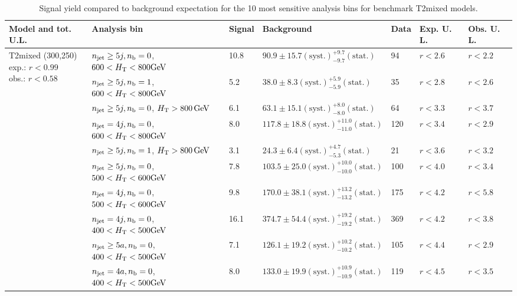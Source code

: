 \begin{table}[h!] 
  \scriptsize
  \caption{ 
Signal yield compared to background expectation for the 10 most sensitive analysis bins 
for benchmark T2mixed models.
  \label{tab:sigBenchmarksYields_T2mixed}}
  \centering 
  \begin{tabular}{ lllllll } 
    \hline 
    \hline 
    Model and tot. U.L. & Analysis bin & Signal & Background & Data & Exp. U. L. & Obs. U. L. \\ \hline
\multirow{10}{*}{\parbox[t]{2.3cm}{T2mixed (300,250)\\exp.: $r<0.99$\\obs.: $r<0.58$}}
 & $n_{\mathrm{jet}} \geq5j,n_{\text{b}} =0$, $600 < \mbox{$H_\text{T}$} < 800 \mathrm{GeV}$ & 10.8 & $90.9 \pm 15.7 \mathrm{(syst.)} ^{+9.7}_{-9.7} \mathrm{(stat.)}$ & 94 & $r < 2.6$ & $r < 2.2$\\ 
 & $n_{\mathrm{jet}} \geq5j,n_{\text{b}} =1$, $600 < \mbox{$H_\text{T}$} < 800 \mathrm{GeV}$ & 5.2 & $38.0 \pm 8.3 \mathrm{(syst.)} ^{+5.9}_{-5.9} \mathrm{(stat.)}$ & 35 & $r < 2.8$ & $r < 2.6$\\ 
 & $n_{\mathrm{jet}} \geq5j,n_{\text{b}} =0$, $\mbox{$H_\text{T}$} > 800 \, \mathrm{GeV}$ & 6.1 & $63.1 \pm 15.1 \mathrm{(syst.)} ^{+8.0}_{-8.0} \mathrm{(stat.)}$ & 64 & $r < 3.3$ & $r < 3.7$\\ 
 & $n_{\mathrm{jet}} =4j,n_{\text{b}} =0$, $600 < \mbox{$H_\text{T}$} < 800 \mathrm{GeV}$ & 8.0 & $117.8 \pm 18.8 \mathrm{(syst.)} ^{+11.0}_{-11.0} \mathrm{(stat.)}$ & 120 & $r < 3.4$ & $r < 2.9$\\ 
 & $n_{\mathrm{jet}} \geq5j,n_{\text{b}} =1$, $\mbox{$H_\text{T}$} > 800 \, \mathrm{GeV}$ & 3.1 & $24.3 \pm 6.4 \mathrm{(syst.)} ^{+4.7}_{-5.3} \mathrm{(stat.)}$ & 21 & $r < 3.6$ & $r < 3.2$\\ 
 & $n_{\mathrm{jet}} \geq5j,n_{\text{b}} =0$, $500 < \mbox{$H_\text{T}$} < 600 \mathrm{GeV}$ & 7.8 & $103.5 \pm 25.0 \mathrm{(syst.)} ^{+10.0}_{-10.0} \mathrm{(stat.)}$ & 100 & $r < 4.0$ & $r < 3.4$\\ 
 & $n_{\mathrm{jet}} =4j,n_{\text{b}} =0$, $500 < \mbox{$H_\text{T}$} < 600 \mathrm{GeV}$ & 9.8 & $170.0 \pm 38.1 \mathrm{(syst.)} ^{+13.2}_{-13.2} \mathrm{(stat.)}$ & 175 & $r < 4.2$ & $r < 5.8$\\ 
 & $n_{\mathrm{jet}} =4j,n_{\text{b}} =0$, $400 < \mbox{$H_\text{T}$} < 500 \mathrm{GeV}$ & 16.1 & $374.7 \pm 54.4 \mathrm{(syst.)} ^{+19.2}_{-19.2} \mathrm{(stat.)}$ & 369 & $r < 4.2$ & $r < 3.8$\\ 
 & $n_{\mathrm{jet}} \geq5a,n_{\text{b}} =0$, $400 < \mbox{$H_\text{T}$} < 500 \mathrm{GeV}$ & 7.1 & $126.1 \pm 19.2 \mathrm{(syst.)} ^{+10.2}_{-10.2} \mathrm{(stat.)}$ & 105 & $r < 4.4$ & $r < 2.9$\\ 
 & $n_{\mathrm{jet}} =4a,n_{\text{b}} =0$, $400 < \mbox{$H_\text{T}$} < 500 \mathrm{GeV}$ & 8.0 & $133.0 \pm 19.9 \mathrm{(syst.)} ^{+10.9}_{-10.9} \mathrm{(stat.)}$ & 119 & $r < 4.5$ & $r < 3.5$\\ \hline
    \hline
  \end{tabular}
\end{table}

